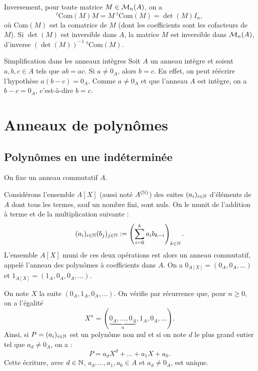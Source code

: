 \documentclass[]{report}
\begin{document}
\begin{ex}{}{}
\begin{enumerate}
        Inversement, pour toute matrice $M \in \mathcal{M}_n(A)$, on a
        \[{}^t\mathrm{Com}(M) M = M \; {}^t\mathrm{Com}(M) = \det(M) I_n,\]
        où $\mathrm{Com}(M)$ est la comatrice de $M$ (dont les coefficients sont les cofacteurs de $M$). Si $\det(M)$ est inversible dans $A$, la matrice $M$ est inversible dans $\mathcal{M}_n(A)$, d'inverse $(\det(M))^{-1} \; {}^t\mathrm{Com}(M)$.
    \end{enumerate}
\end{ex}

\begin{re}{Simplification dans les anneaux intègres}{}
    Soit $A$ un anneau intègre et soient $a, b, c \in A$ tels que $ab = ac$. Si $a \neq 0_A$, alors $b = c$. En effet, on peut réécrire l'hypothèse $a(b - c) = 0_A$. Comme $a \neq 0_A$ et que l'anneau $A$ est intègre, on a $b - c = 0_A$, c'est-à-dire $b = c$.
\end{re}

\section{Anneaux de polynômes}

\subsection{Polynômes en une indéterminée}

On fixe un anneau commutatif $A$.

\begin{df}{}{}
    Considérons l'ensemble $A[X]$ (aussi noté $A^{(\mathbb{N})}$) des suites $(a_i)_{i\in \mathbb{N}}$ d'éléments de $A$ dont tous les termes, sauf un nombre fini, sont nuls. On le munit de l'addition à terme et de la multiplication suivante :
    \[(a_i)_{i \in \mathbb{N}} (b_j)_{j \in \mathbb{N}} := \left(\sum_{i = 0}^{k} a_i b_{k - i}\right)_{k \in \mathbb{N}}.\]
    L'ensemble $A[X]$ muni de ces deux opérations est alors un anneau commutatif, appelé l'anneau des polynômes à coefficients dans $A$. On a $0_{A[X]} = (0_A, 0_A, \ldots)$ et $1_{A[X]} = (1_A, 0_A, 0_A, \ldots)$.

    On note $X$ la suite $(0_A, 1_A, 0_A, \ldots)$. On vérifie par récurrence que, pour $n \ge 0$, on a l'égalité
    \[X^n = (\underbrace{0_A, \ldots, 0_A}_{n}, 1_A, 0_A, \ldots).\]
    Ainsi, si $P = (a_i)_{i \in \mathbb{N}}$ est un polynôme non nul et si on note $d$ le plus grand entier tel que $a_d \neq 0_A$, on a :
    \[P = a_d X^d + \dots + a_1 X + a_0.\]
    Cette écriture, avec $d \in \mathbb{N}$, $a_d, \ldots, a_1, a_0 \in A$ et $a_d \neq 0_A$, est unique.
\end{df}
\end{document}
